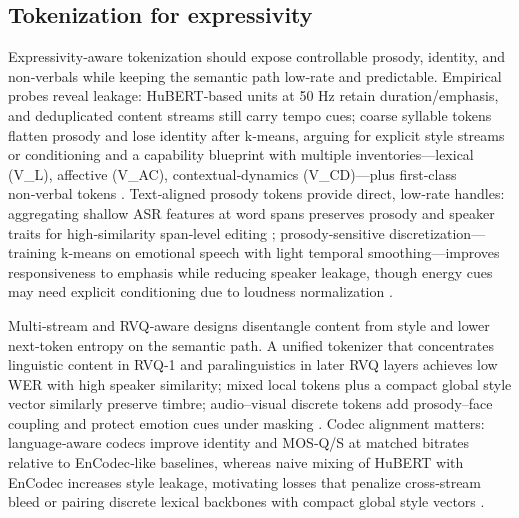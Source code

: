 \subsection{Tokenization for expressivity} \label{subsec:Tokenization for expressivity}
Expressivity‑aware tokenization should expose controllable prosody, identity, and non‑verbals while keeping the semantic path low‑rate and predictable. Empirical probes reveal leakage: HuBERT‑based units at 50 Hz retain duration/emphasis, and deduplicated content streams still carry tempo cues; coarse syllable tokens flatten prosody and lose identity after k‑means, arguing for explicit style streams or conditioning and a capability blueprint with multiple inventories—lexical (V\_L), affective (V\_{AC}), contextual‑dynamics (V\_{CD})—plus first‑class non‑verbal tokens \cite{peng2024empiricalstudyspeechlanguagemodelsprompt,wang2025bossbeyondsemanticspeech}. Text‑aligned prosody tokens provide direct, low‑rate handles: aggregating shallow ASR features at word spans preserves prosody and speaker traits for high‑similarity span‑level editing \cite{tseng2025tastetextalignedspeechtokenizationembedd}; prosody‑sensitive discretization—training k‑means on emotional speech with light temporal smoothing—improves responsiveness to emphasis while reducing speaker leakage, though energy cues may need explicit conditioning due to loudness normalization \cite{onda2025benchmarkingprosodyencodingdiscretespeec}.

Multi‑stream and RVQ‑aware designs disentangle content from style and lower next‑token entropy on the semantic path. A unified tokenizer that concentrates linguistic content in RVQ‑1 and paralinguistics in later RVQ layers achieves low WER with high speaker similarity; mixed local tokens plus a compact global style vector similarly preserve timbre; audio–visual discrete tokens add prosody–face coupling and protect emotion cues under masking \cite{zhang2024speechtokenizerunifiedspeechtokenizerlar,messica2024nastnoiseawarespeechtokenizationlanguage,sadok2025vectorquantizedmaskedautoencoderaudiovis}. Codec alignment matters: language‑aware codecs improve identity and MOS‑Q/S at matched bitrates relative to EnCodec‑like baselines, whereas naive mixing of HuBERT with EnCodec increases style leakage, motivating losses that penalize cross‑stream bleed or pairing discrete lexical backbones with compact global style vectors \cite{ji2025languagecodecbridgingdiscreterepresentat,peng2024empiricalstudyspeechlanguagemodelsprompt}. 

